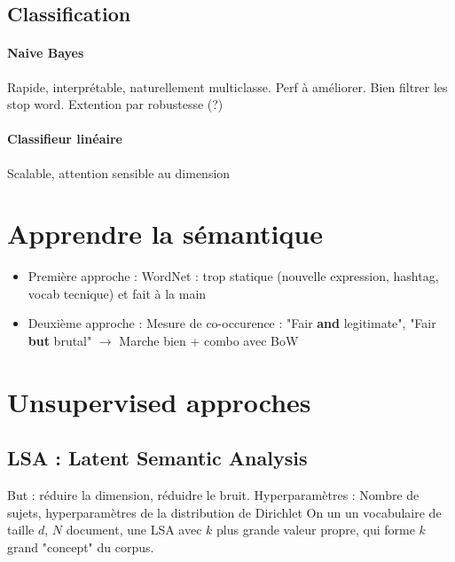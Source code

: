 \documentclass{article}
\begin{document}
\begin{multicols}{2}
    \subsection{Classification}
    \paragraph*{Naive Bayes}
    Rapide, interprétable, naturellement multiclasse. Perf à améliorer. Bien filtrer les stop word. Extention par robustesse (?)
    
    \paragraph*{Classifieur linéaire}
    Scalable, attention sensible au dimension
    
    \section{Apprendre la sémantique}
    \begin{itemize}
        \item Première approche : WordNet : trop statique (nouvelle expression, hashtag, vocab tecnique) et fait à la main 
        \item Deuxième approche : Mesure de co-occurence : "Fair \textbf{and} legitimate", "Fair \textbf{but} brutal" $\rightarrow$ Marche bien + combo avec BoW
    \end{itemize}
    
    \section{Unsupervised approches}
    \subsection{LSA : Latent Semantic Analysis}
    But : réduire la dimension, réduidre le bruit. Hyperparamètres : Nombre de sujets, hyperparamètres de la distribution de Dirichlet
    On un un vocabulaire de taille $ d $, $ N $ document, une LSA avec $ k $ plus grande valeur propre, qui forme $ k $ grand "concept" du corpus.
    

\end{multicols}
\end{document}
